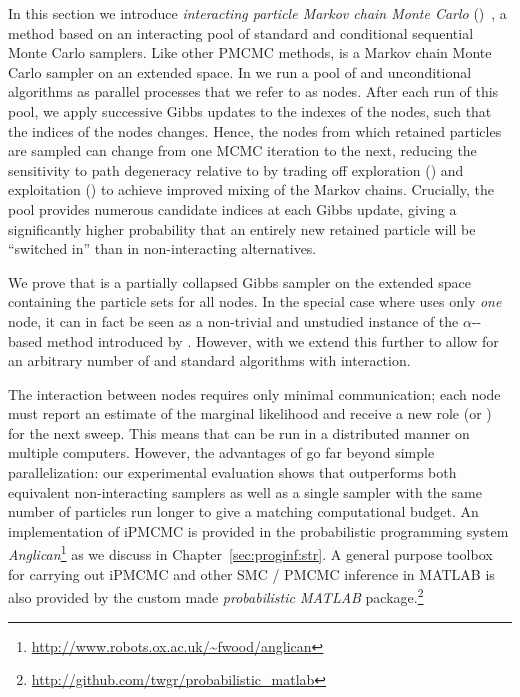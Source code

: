

In this section we introduce \emph{interacting particle Markov chain Monte Carlo} (\ipmcmc)~\citep{rainforth2016interacting},
a \pmcmc method based on an interacting pool of standard and conditional sequential Monte Carlo samplers. Like 
other PMCMC methods, \ipmcmc is a Markov chain Monte Carlo sampler on an extended space. In \ipmcmc we run a pool of 
\csmc and unconditional \smc algorithms as parallel processes that we refer to as nodes. After each run of this pool, 
we apply successive Gibbs updates to the indexes of the \csmc nodes, such that the indices of the \csmc nodes changes. 
Hence, the nodes from which retained particles are sampled can change from one MCMC iteration to the next, reducing
the sensitivity to path degeneracy relative to \pg 
by trading off exploration (\smc) and exploitation (\csmc) to achieve improved mixing of the Markov chains. Crucially, 
the pool provides numerous candidate indices at each Gibbs update, giving a significantly higher probability that an 
entirely new retained particle will be ``switched in'' than in non-interacting alternatives.

We prove that \ipmcmc is a partially collapsed Gibbs sampler on the extended space containing the particle sets for all nodes. 
In the special case where \ipmcmc uses only \emph{one} \csmc node, it can in fact be seen as a non-trivial and unstudied 
instance of the $\alpha$-\smc-based \citep{whiteley2016} \pmcmc method introduced by \citet{huggins2015}. 
However, with \ipmcmc we extend this further to allow for an arbitrary number of \csmc and standard \smc algorithms 
with interaction.

The interaction between nodes requires only minimal communication; each node must report an estimate of the marginal likelihood 
and receive a new role (\smc or \csmc) for the next sweep. This means that \ipmcmc 
can be run in a distributed manner on multiple computers.  However, the advantages of \ipmcmc go far beyond
simple parallelization: our experimental evaluation shows that \ipmcmc outperforms both equivalent
non-interacting \pmcmc samplers as well as a single \pg sampler with the same number of particles run longer
to give a matching computational budget.
An implementation of iPMCMC is provided in the probabilistic programming system
\emph{Anglican}\footnote{\scriptsize \url{http://www.robots.ox.ac.uk/~fwood/anglican}} \citep{wood2014new} as we discuss in Chapter~\ref{sec:proginf:str}.  A general 
purpose toolbox for carrying out iPMCMC and other SMC / PMCMC inference in MATLAB is also provided by the custom
made \emph{probabilistic MATLAB} package.\footnote{\scriptsize \url{http://github.com/twgr/probabilistic_matlab}}